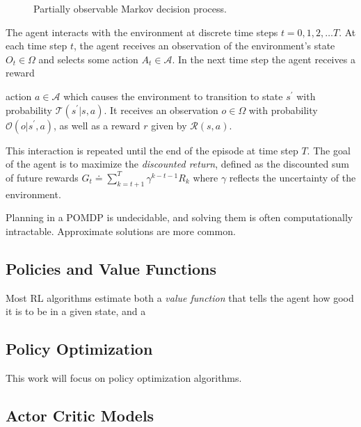 \begin{figure}
    \centering
    
    \label{fig:pomdp}
    \caption{Partially observable Markov decision process.}
\end{figure}

The agent interacts with the environment at discrete time steps \(t = 0, 1, 2, \dots T\). At each time step \(t\), the agent receives an observation of the environment's state \(O_t \in \Omega\) and selects some action \(A_t \in \mathcal{A}\). In the next time step the agent receives a reward

action \(a \in \mathcal{A}\) which causes the environment to transition to state \(s^\prime\) with probability \(\mathcal{T}(s^\prime | s, a)\).
It receives an observation \(o \in \Omega\) with probability \(\mathcal{O}(o | s^\prime, a)\), as well as a reward \(r\) given by \(\mathcal{R}(s, a)\).

This interaction is repeated until the end of the episode at time step \(T\). The goal of the agent is to maximize the \textit{discounted return}, defined as the discounted sum of future rewards \(G_t \doteq \sum_{k=t+1}^T \gamma^{k-t-1} R_{k}\) where \(\gamma\) reflects the uncertainty of the environment.


Planning in a POMDP is undecidable, and solving them is often computationally intractable. Approximate solutions are more common.

\subsection{Policies and Value Functions}

Most RL algorithms estimate both a \textit{value function} that tells the agent how good it is to be in a given state, and a 

\subsection{Policy Optimization}

This work will focus on policy optimization algorithms.

\subsection{Actor Critic Models}

